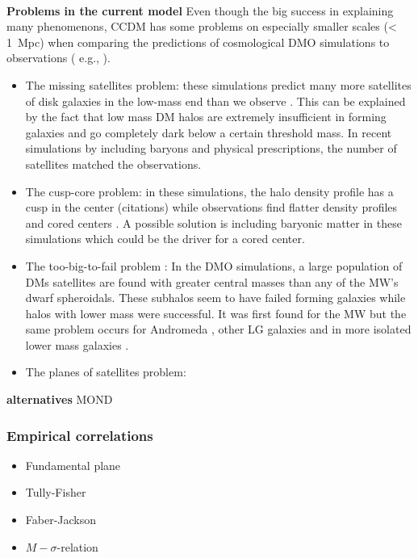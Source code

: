 \\\textbf{Problems in the current model}
Even though the big success in explaining many phenomenons, \ac{CCDM} has some problems on especially smaller scales (< \SI{1}{Mpc}) when comparing the predictions of cosmological \ac{DMO} simulations to observations ( e.g., \cite{Bullock...LCDMprobs...2017}). 
\begin{itemize}
    \item The missing satellites problem: these simulations predict many more satellites of disk galaxies in the low-mass end than we observe \citep{Klypin...missingsatellites...1999, Moore...missingsatellites..1999}. This can be explained by the fact that low mass \ac{DM} halos are extremely insufficient in forming galaxies and go completely dark below a certain threshold mass. In recent simulations by \citet{Sawala...noCDMproblems...2016} including baryons and physical prescriptions, the number of satellites matched the observations.
    \item The cusp-core problem: in these simulations, the halo density profile has a cusp in the center (citations) while observations find flatter density profiles and cored centers \citep{Flores...cuspcoreprob...1994, Moore...cuspcoreprob...1994}. A possible solution is including baryonic matter in these simulations which could be the driver for a cored center. 
    \item The too-big-to-fail problem \citep{Boylan...toobigtoofail...2011}: In the \ac{DMO} simulations, a large population of \acp{DM} satellites are found with greater central masses than any of the \ac{MW}'s dwarf spheroidals. These subhalos seem to have failed forming galaxies while halos with lower mass were successful. It was first found for the \ac{MW} but the same problem occurs for Andromeda \citep{Tollerud...M31tbtf...2014}, other \ac{LG} galaxies \citep{Kirby...LGtbtf...2014} and in more isolated lower mass galaxies \citep{Ferrero...DGtbtf...2012, Papastergis...DGtbtf...2015, Papastergis...DGtbtf...2016}.
    \item The planes of satellites problem: 
\end{itemize}

\textbf{alternatives}
MOND
\subsubsection{Empirical correlations}
\begin{itemize}
    \item Fundamental plane
    \item Tully-Fisher
    \item Faber-Jackson
    \item $M-\sigma$-relation
\end{itemize}

